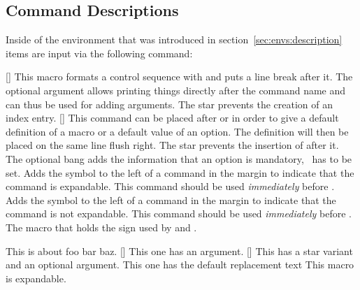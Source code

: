\documentclass[load-preamble+,babel-options={ngerman,english}]{cnltx-doc}
\begin{document}
\subsection{Command Descriptions}\label{sec:usage:commands}
Inside of the environment  that was introduced in
section~\vref{sec:envs:description} items are input via the following command:
\begin{commands}
  [\sarg{}]
    This macro formats a control sequence with  and puts a line break
    after it.  The optional argument allows printing things directly after the
    command name and can thus be used for adding arguments.  The star prevents
    the creation of an index entry.
  [\sarg\code{!}]
    This command can be placed after  or
      in order to give a default definition of a macro or a default
    value of an option.  The definition will then be placed on the same line
    flush right.  The star prevents the insertion of  after it.
    The optional bang adds the information that an option is mandatory, \ie\
    has to be set.
    Adds the symbol \textcolor{expandable}{\expandablesign}
    to the left of a command in the margin to indicate that the command is
    expandable.  This command should be used \emph{immediately} before
    \cs{command}.
    Adds the symbol \textcolor{unexpandable}{\expandablesign}
    to the left of a command in the margin to indicate that the command is not
    expandable.  This command should be used \emph{immediately} before
    \cs{command}.
    The macro that holds the sign used by 
    and \cs{unexpandable}.
\end{commands}

\begin{example}
  \begin{commands}
      This is about foo bar baz.
    []
      This one has an argument.
    [\sarg{}]
      This has a star variant and an optional argument.
      This one has the default replacement text 
    \expandable\command{cs}
      This macro is expandable.
  \end{commands}
\end{example}
\end{document}
